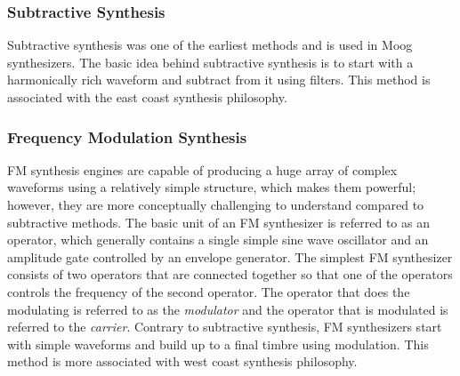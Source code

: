\subsubsection{Subtractive Synthesis}
Subtractive synthesis was one of the earliest methods and is used in Moog synthesizers. The basic idea behind subtractive synthesis is to start with a harmonically rich waveform and subtract from it using filters. This method is associated with the east coast synthesis philosophy. 


\subsubsection{Frequency Modulation Synthesis}
FM synthesis engines are capable of producing a huge array of complex waveforms using a relatively simple structure, which makes them powerful; however, they are more conceptually challenging to understand compared to subtractive methods. The basic unit of an FM synthesizer is referred to as an operator, which generally contains a single simple sine wave oscillator and an amplitude gate controlled by an envelope generator. The simplest FM synthesizer consists of two operators that are connected together so that one of the operators controls the frequency of the second operator. The operator that does the modulating is referred to as the \textit{modulator} and the operator that is modulated is referred to the \textit{carrier}. Contrary to subtractive synthesis, FM synthesizers start with simple waveforms and build up to a final timbre using modulation. This method is more associated with west coast synthesis philosophy.


